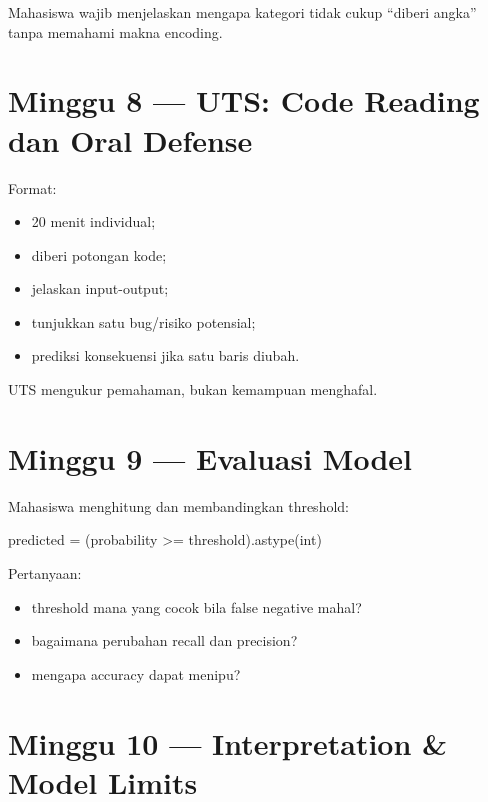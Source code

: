 \documentclass[
  indonesian,
  letterpaper,
  DIV=11,
  numbers=noendperiod]{scrreprt}
\newenvironment{Shaded}{\begin{snugshade}}{\end{snugshade}}
\newcommand{\BuiltInTok}[1]{\textcolor[rgb]{0.00,0.23,0.31}{#1}}
\newcommand{\NormalTok}[1]{\textcolor[rgb]{0.00,0.23,0.31}{#1}}
\newcommand{\OperatorTok}[1]{\textcolor[rgb]{0.37,0.37,0.37}{#1}}
\providecommand{\tightlist}{%
  \setlength{\itemsep}{0pt}\setlength{\parskip}{0pt}}
\begin{document}
Mahasiswa wajib menjelaskan mengapa kategori tidak cukup ``diberi
angka'' tanpa memahami makna encoding.

\section{Minggu 8 --- UTS: Code Reading dan Oral
Defense}\label{minggu-8-uts-code-reading-dan-oral-defense}

Format:

\begin{itemize}
\tightlist
\item
  20 menit individual;
\item
  diberi potongan kode;
\item
  jelaskan input-output;
\item
  tunjukkan satu bug/risiko potensial;
\item
  prediksi konsekuensi jika satu baris diubah.
\end{itemize}

UTS mengukur pemahaman, bukan kemampuan menghafal.

\section{Minggu 9 --- Evaluasi Model}\label{minggu-9-evaluasi-model}

Mahasiswa menghitung dan membandingkan threshold:

\begin{Shaded}
\begin{Highlighting}[]
\NormalTok{predicted }\OperatorTok{=}\NormalTok{ (probability }\OperatorTok{\textgreater{}=}\NormalTok{ threshold).astype(}\BuiltInTok{int}\NormalTok{)}
\end{Highlighting}
\end{Shaded}

Pertanyaan:

\begin{itemize}
\tightlist
\item
  threshold mana yang cocok bila false negative mahal?
\item
  bagaimana perubahan recall dan precision?
\item
  mengapa accuracy dapat menipu?
\end{itemize}

\section{Minggu 10 --- Interpretation \& Model
Limits}\label{minggu-10-interpretation-model-limits}
\end{document}
